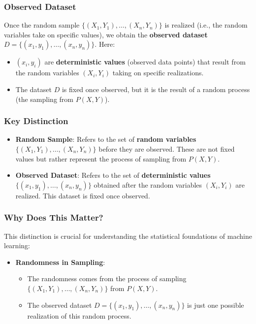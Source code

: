 \begin{notechapter}
\subsubsection{Observed Dataset}

Once the random sample \( \{(X_1, Y_1), \dots, (X_n, Y_n)\} \) is realized (i.e., the random variables take on specific values), we obtain the \textbf{observed dataset} \( D = \{(x_1, y_1), \dots, (x_n, y_n)\} \). Here:
\begin{itemize}
    \item \( (x_i, y_i) \) are \textbf{deterministic values} (observed data points) that result from the random variables \( (X_i, Y_i) \) taking on specific realizations.
    \item The dataset \( D \) is fixed once observed, but it is the result of a random process (the sampling from \( P(X, Y) \)).
\end{itemize}

\subsubsection{Key Distinction}

\begin{itemize}
    \item \textbf{Random Sample}: Refers to the set of \textbf{random variables} \( \{(X_1, Y_1), \dots, (X_n, Y_n)\} \) before they are observed. These are not fixed values but rather represent the process of sampling from \( P(X, Y) \).
    \item \textbf{Observed Dataset}: Refers to the set of \textbf{deterministic values} \( \{(x_1, y_1), \dots, (x_n, y_n)\} \) obtained after the random variables \( (X_i, Y_i) \) are realized. This dataset is fixed once observed.
\end{itemize}

\subsubsection{Why Does This Matter?}

This distinction is crucial for understanding the statistical foundations of machine learning:
\begin{itemize}
    \item \textbf{Randomness in Sampling}:
        \begin{itemize}
            \item The randomness comes from the process of sampling \( \{(X_1, Y_1), \dots, (X_n, Y_n)\} \) from \( P(X, Y) \).
            \item The observed dataset \( D = \{(x_1, y_1), \dots, (x_n, y_n)\} \) is just one possible realization of this random process.
        \end{itemize}


\end{itemize}
\end{notechapter}
